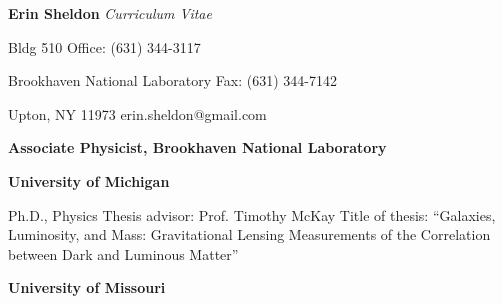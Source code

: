 \setlength{\oddsidemargin}{-0.1in}
\setlength{\evensidemargin}{-0.1in}
\setlength{\textwidth}{6.7in}
\setlength{\topmargin}{-0.25in}
\setlength{\textheight}{9.0in}

\newcommand{\tsp}{\vspace{0.1cm}}
\newcommand{\isp}{\vspace{0.3cm}}
\newcommand{\ssp}{\vspace{0.4cm}}



\begin{center}
  {\LARGE {\bf Erin Sheldon}}
  {\large {\it Curriculum Vitae}}
\end{center}

%
%


\noindent
{Bldg 510} \hfill {Office: (631) 344-3117}

\noindent 
{Brookhaven National Laboratory} \hfill {Fax: (631) 344-7142}

\noindent
{Upton, NY 11973} \hfill {erin.sheldon@gmail.com}








\ssp
\ssp
\noindent
{}
{\bf Associate Physicist, Brookhaven National Laboratory}
\hfill
{}
\normalsize




\ssp
\ssp
\noindent
{}
{\bf University of Michigan}
\hfill
{}
\normalsize

\tsp
\noindent
\makebox[1.25in][l]{}
\parbox{5.40in}{
Ph.D., Physics\newline
Thesis advisor: Prof. Timothy McKay\newline
Title of thesis: ``Galaxies, Luminosity, and Mass: Gravitational Lensing Measurements of the Correlation between Dark and Luminous Matter''
}

\isp
\noindent
\makebox[1.25in][l]{}
{\bf University of Missouri}
\hfill
{}
\normalsize

